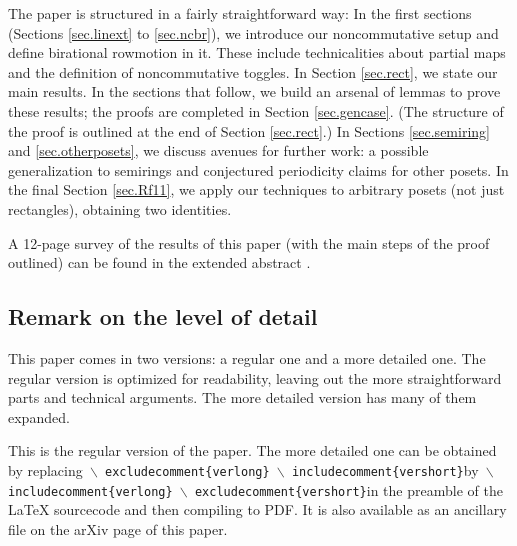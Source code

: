 \documentclass[numbers=enddot,12pt,final,onecolumn,notitlepage]{scrartcl}%
\theoremstyle{definition}
\newenvironment{vershort}{}{}
\begin{document}
The paper is structured in a fairly straightforward way: In the first sections
(Sections \ref{sec.linext} to \ref{sec.ncbr}), we introduce our noncommutative
setup and define birational rowmotion in it. These include technicalities
about partial maps and the definition of noncommutative toggles. In Section
\ref{sec.rect}, we state our main results. In the sections that follow, we
build an arsenal of lemmas to prove these results; the proofs are completed in
Section \ref{sec.gencase}. (The structure of the proof is outlined at the end
of Section \ref{sec.rect}.) In Sections \ref{sec.semiring} and
\ref{sec.otherposets}, we discuss avenues for further work: a possible
generalization to semirings and conjectured periodicity claims for other
posets. In the final Section \ref{sec.Rf11}, we apply our techniques to
arbitrary posets (not just rectangles), obtaining two identities.

A 12-page survey of the results of this paper (with the main steps of the
proof outlined) can be found in the extended abstract \cite{this-fpsac}.

\subsection{Remark on the level of detail}

This paper comes in two versions: a regular one and a more detailed one. The
regular version is optimized for readability, leaving out the more
straightforward parts and technical arguments. The more detailed version has
many of them expanded.

\begin{vershort}
This is the regular version of the paper. The more detailed one can be
obtained by replacing\newline\texttt{%
$\backslash$%
excludecomment\{verlong\}}\newline\texttt{%
$\backslash$%
includecomment\{vershort\}}\newline by\newline\texttt{%
$\backslash$%
includecomment\{verlong\}}\newline\texttt{%
$\backslash$%
excludecomment\{vershort\}}\newline in the preamble of the LaTeX sourcecode
and then compiling to PDF. It is also available as an ancillary file on the
arXiv page of this paper.
\end{vershort}
\end{document}
